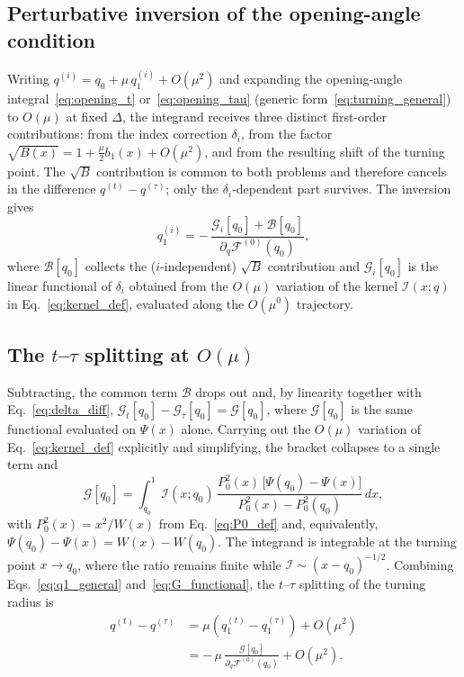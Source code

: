 \documentclass[
  aps,
  prd,
  twocolumn,
  nofootinbib,
  superscriptaddress,
  longbibliography
]{revtex4-2}
\begin{document}
\subsection{Perturbative inversion of the opening-angle condition}

Writing $q^{(i)}=q_0+\mu\,q_1^{(i)}+O(\mu^2)$ and expanding the
opening-angle integral~\eqref{eq:opening_t} or~\eqref{eq:opening_tau}
(generic form~\eqref{eq:turning_general}) to $O(\mu)$ at fixed $\Delta$,
the integrand receives three distinct first-order contributions: from
the index correction $\delta_i$, from the factor $\sqrt{B(x)}=1+
\tfrac{\mu}{2}b_1(x)+O(\mu^2)$, and from the resulting shift of the
turning point. The $\sqrt{B}$ contribution is common to both problems
and therefore cancels in the difference $q^{(t)}-q^{(\tau)}$; only the
$\delta_i$-dependent part survives. The inversion gives
\begin{equation}
q_1^{(i)}
=
-\,
\frac{\mathcal{G}_i[q_0]+\mathcal{B}[q_0]}
{\partial_q\mathcal{F}^{(0)}(q_0)},
\label{eq:q1_general}
\end{equation}
where $\mathcal{B}[q_0]$ collects the ($i$-independent) $\sqrt{B}$
contribution and $\mathcal{G}_i[q_0]$ is the linear functional of
$\delta_i$ obtained from the $O(\mu)$ variation of the kernel
$\mathcal{I}(x;q)$ in Eq.~\eqref{eq:kernel_def}, evaluated along the
$O(\mu^0)$ trajectory.

\subsection{The $t$--$\tau$ splitting at $O(\mu)$}

Subtracting, the common term $\mathcal{B}$ drops out and, by
linearity together with Eq.~\eqref{eq:delta_diff},
$\mathcal{G}_t[q_0]-\mathcal{G}_\tau[q_0]=\mathcal{G}[q_0]$, where
$\mathcal{G}[q_0]$ is the same functional evaluated on $\Psi(x)$ alone.
Carrying out the $O(\mu)$ variation of Eq.~\eqref{eq:kernel_def}
explicitly and simplifying, the bracket collapses to a single term and
\begin{equation}
\mathcal{G}[q_0]
=
\int_{q_0}^1
\mathcal{I}(x;q_0)\,
\frac{P_0^2(x)\,\bigl[\Psi(q_0)-\Psi(x)\bigr]}
     {P_0^2(x)-P_0^2(q_0)}
\,dx,
\label{eq:G_functional}
\end{equation}
with $P_0^2(x)=x^2/W(x)$ from Eq.~\eqref{eq:P0_def} and, equivalently,
$\Psi(q_0)-\Psi(x)=W(x)-W(q_0)$. The integrand is integrable at the
turning point $x\to q_0$, where the ratio remains finite while
$\mathcal{I}\sim(x-q_0)^{-1/2}$. Combining
Eqs.~\eqref{eq:q1_general} and~\eqref{eq:G_functional}, the $t$--$\tau$
splitting of the turning radius is
\begin{equation}
\boxed{
\begin{aligned}
q^{(t)}-q^{(\tau)}
&=
\mu\left(q_1^{(t)}-q_1^{(\tau)}\right)+O(\mu^2)
\\[4pt]
&=
-\,\mu\,
\frac{\mathcal{G}[q_0]}{\partial_q\mathcal{F}^{(0)}(q_0)}
+O(\mu^2).
\end{aligned}
}
\label{eq:dq1_final}
\end{equation}
\end{document}
